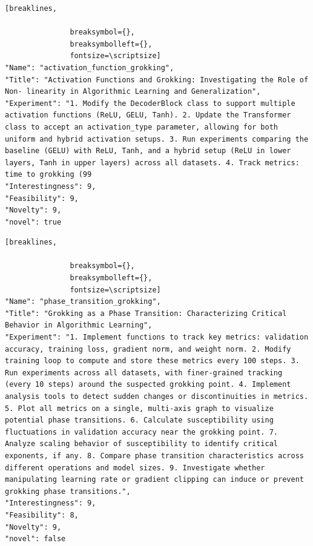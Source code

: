 \begin{tcolorbox}[
  breakable,
  colback  = blue!5!white,
  colframe = blue!75!black,
  title    = {Idea 42/50 - \texttt{activation\_function\_grokking}},
  fontupper=\scriptsize\ttfamily,
]
\begin{Verbatim}[breaklines,

               breaksymbol={},
               breaksymbolleft={},
               fontsize=\scriptsize]
"Name": "activation_function_grokking",
"Title": "Activation Functions and Grokking: Investigating the Role of Non- linearity in Algorithmic Learning and Generalization",
"Experiment": "1. Modify the DecoderBlock class to support multiple activation functions (ReLU, GELU, Tanh). 2. Update the Transformer class to accept an activation_type parameter, allowing for both uniform and hybrid activation setups. 3. Run experiments comparing the baseline (GELU) with ReLU, Tanh, and a hybrid setup (ReLU in lower layers, Tanh in upper layers) across all datasets. 4. Track metrics: time to grokking (99
"Interestingness": 9,
"Feasibility": 9,
"Novelty": 9,
"novel": true
\end{Verbatim}
\end{tcolorbox}

\begin{tcolorbox}[
  breakable,
  colback  = blue!5!white,
  colframe = blue!75!black,
  title    = {Idea 43/50 - \texttt{phase\_transition\_grokking}},
  fontupper=\scriptsize\ttfamily,
]
\begin{Verbatim}[breaklines,

               breaksymbol={},
               breaksymbolleft={},
               fontsize=\scriptsize]
"Name": "phase_transition_grokking",
"Title": "Grokking as a Phase Transition: Characterizing Critical Behavior in Algorithmic Learning",
"Experiment": "1. Implement functions to track key metrics: validation accuracy, training loss, gradient norm, and weight norm. 2. Modify training loop to compute and store these metrics every 100 steps. 3. Run experiments across all datasets, with finer-grained tracking (every 10 steps) around the suspected grokking point. 4. Implement analysis tools to detect sudden changes or discontinuities in metrics. 5. Plot all metrics on a single, multi-axis graph to visualize potential phase transitions. 6. Calculate susceptibility using fluctuations in validation accuracy near the grokking point. 7. Analyze scaling behavior of susceptibility to identify critical exponents, if any. 8. Compare phase transition characteristics across different operations and model sizes. 9. Investigate whether manipulating learning rate or gradient clipping can induce or prevent grokking phase transitions.",
"Interestingness": 9,
"Feasibility": 8,
"Novelty": 9,
"novel": false
\end{Verbatim}
\end{tcolorbox}

